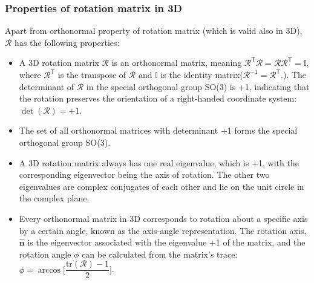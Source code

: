 \documentclass{article}
\def\nh{\hat{\mathbf{n}}}
\def\R{\mathcal{R}}
\def\I{\mathbb{I}}
\def\T{\mathsf{T}}
\def\nh{\hat{\mathbf{n}}}
\begin{document}
\subsubsection*{Properties of rotation matrix in 3D}
Apart from orthonormal property of rotation matrix (which is valid also in 3D), $\R$ has the following properties:
\begin{itemize}
  \item A 3D rotation matrix \(\R\) is an orthonormal matrix, meaning \(\R^\T \R = \R \R^\T = \I\), where \(\R^\T\) is the transpose of \(\R\) and \(\I\) is the identity matrix(\(\R^{-1} = \R^\T\).). The determinant of \(\R\) in the special orthogonal group SO(3) is +1, indicating that the rotation preserves the orientation of a right-handed coordinate system: \(\det(\R) = +1\).
  \item The set of all orthonormal matrices with determinant +1 forms the special orthogonal group SO(3).
  \item A 3D rotation matrix always has one real eigenvalue, which is +1, with the corresponding eigenvector being the axis of rotation. The other two eigenvalues are complex conjugates of each other and lie on the unit circle in the complex plane.
  \item Every orthonormal matrix in 3D corresponds to rotation about a specific axis by a certain angle, known as the axis-angle representation. The rotation axis, $\nh$ is the eigenvector associated with the eigenvalue +1 of the matrix, and the rotation angle \(\phi\) can be calculated from the matrix's trace: \(\phi = \arccos\Big[ \dfrac{\text{tr}(\R) - 1}{2} \Big]\).
\end{itemize}
\end{document}
